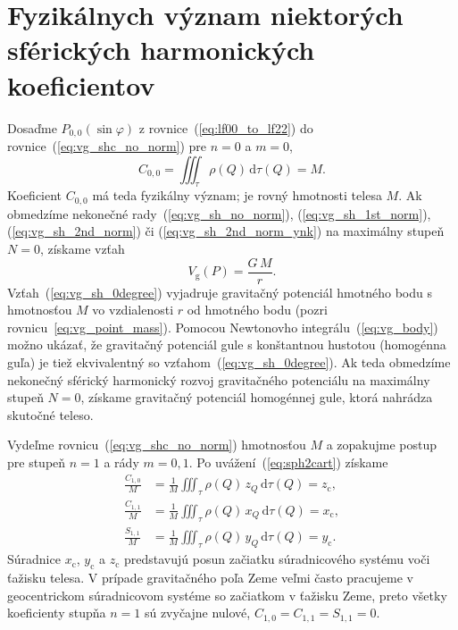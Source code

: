 \documentclass[a4paper, 12pt]{book}
\newcommand{\diff}{\mathrm d}
\newcommand{\gidx}{\mathrm g}
\begin{document}

\section{Fyzikálnych význam niektorých sférických harmonických koeficientov}
\label{sec:physical_meaning_of_spherical_harmonic_coefficients}

Dosaďme $P_{0,0}(\sin\varphi)$ z rovnice~(\ref{eq:lf00_to_lf22})
do rovnice~(\ref{eq:vg_shc_no_norm}) pre $n = 0$ a $m = 0$,
%
\begin{equation}
C_{0,0} = \iiint_{\tau} \rho(Q) \, \diff \tau(Q) = M{.}
\end{equation}
%
Koeficient $C_{0,0}$ má teda fyzikálny význam; je rovný hmotnosti telesa $M$.  
Ak obmedzíme nekonečné rady~(\ref{eq:vg_sh_no_norm}), 
(\ref{eq:vg_sh_1st_norm}), (\ref{eq:vg_sh_2nd_norm}) či 
(\ref{eq:vg_sh_2nd_norm_ynk}) na maximálny stupeň $N = 0$, získame vzťah
%
\begin{equation}
\label{eq:vg_sh_0degree}
V_\gidx(P) = \frac{G \, M}{r}{.}
\end{equation}
%
Vzťah~(\ref{eq:vg_sh_0degree}) vyjadruje gravitačný potenciál hmotného bodu 
s hmotnosťou $M$ vo vzdialenosti $r$ od hmotného bodu (pozri 
rovnicu~\ref{eq:vg_point_mass}).  Pomocou Newtonovho 
integrálu~(\ref{eq:vg_body}) možno ukázať, že gravitačný potenciál gule 
s konštantnou hustotou (homogénna guľa) je tiež ekvivalentný so 
vzťahom~(\ref{eq:vg_sh_0degree}).  Ak teda obmedzíme nekonečný sférický 
harmonický rozvoj gravitačného potenciálu na maximálny stupeň $N = 0$, získame 
gravitačný potenciál homogénnej gule, ktorá nahrádza skutočné teleso.

Vydeľme rovnicu~(\ref{eq:vg_shc_no_norm}) hmotnosťou $M$ a zopakujme postup pre 
stupeň $n = 1$ a rády $m = 0, 1$.  Po uvážení~(\ref{eq:sph2cart}) získame
%
\begin{equation}
\begin{split}
\frac{C_{1,0}}{M} &= \frac{1}{M} \iiint_{\tau} \rho(Q) \, z_Q \, \diff \tau(Q) 
= z_\mathrm{c}{,}\\
\frac{C_{1,1}}{M} &= \frac{1}{M} \iiint_{\tau} \rho(Q) \, x_Q \, \diff \tau(Q) 
= x_\mathrm{c}{,}\\
\frac{S_{1,1}}{M} &= \frac{1}{M} \iiint_{\tau} \rho(Q) \, y_Q \, \diff \tau(Q) 
= y_\mathrm{c}{.}
\end{split}
\end{equation}
%
Súradnice $x_\mathrm{c}$, $y_\mathrm{c}$ a $z_\mathrm{c}$ predstavujú posun 
začiatku súradnicového systému voči ťažisku telesa.  V prípade gravitačného 
poľa Zeme veľmi často pracujeme v geocentrickom súradnicovom systéme so 
začiatkom v ťažisku Zeme, preto všetky koeficienty stupňa $n = 1$ sú zvyčajne 
nulové, $C_{1,0} = C_{1,1} = S_{1,1} = 0$.
\end{document}
